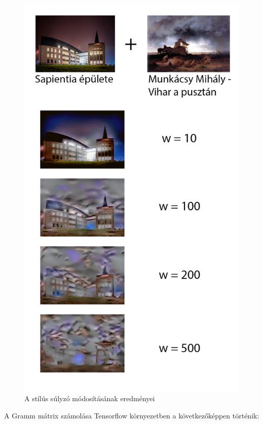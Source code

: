 \documentclass[12pt, a4paper, oneside]{book}
\theoremstyle{tetel}
\begin{document}
\begin{figure}[!htbp]
	\begin{center}
		\includegraphics[scale=0.33]{style_factor.png}
		\caption{A stílús súlyzó módosításának eredményei}
		\label{style_factor}
	\end{center}
\end{figure}

A Gramm mátrix számolása Tensorflow környezetben a következőképpen történik:
\end{document}
